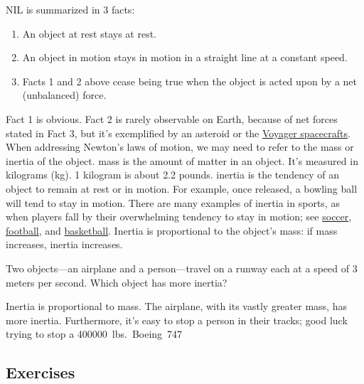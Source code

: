 \documentclass[main.tex]{subfiles}
\begin{document}
\begin{mdframed}[backgroundcolor=black!10]
\gls{NIL} is summarized in 3 facts:
\vspace{-1ex}

\begin{enumerate}
\setlength\itemsep{0ex}
    \item An object at rest stays at rest.
    \item An object in motion stays in motion in a straight line at a constant speed.
    \item Facts 1 and 2 above cease being true when the object is acted upon by a net (unbalanced) force.
\end{enumerate}
\end{mdframed}

Fact 1 is obvious. Fact 2 is rarely observable on Earth, because of net forces stated in Fact 3, but it's exemplified by an asteroid or the \href{https://voyager.jpl.nasa.gov/mission/status/}{Voyager spacecrafts}. When addressing Newton's laws of motion, we may need to refer to the mass or inertia of the object. \Gls{mass} is the amount of matter in an object. It's measured in kilograms (kg). 1 kilogram is about 2.2 pounds. \Gls{inertia} is the tendency of an object to remain at rest or in motion. For example, once released, a bowling ball will tend to stay in motion. There are many examples of inertia in sports, as when players fall by their overwhelming tendency to stay in motion; see \href{https://youtu.be/5PKXs8i_zSw?t=21}{soccer}, \href{https://youtu.be/4TgpW0WZZ6U?t=55}{football}, and \href{https://youtu.be/IGBpvIXGMYQ?t=26}{basketball}. Inertia is proportional to the object's mass: if mass increases, inertia increases.

\begin{example}
Two objects---an airplane and a person---travel on a runway each at a speed of 3 meters per second. Which object has more inertia?
\end{example}

\Solution Inertia is proportional to mass. The airplane, with its vastly greater mass, has more inertia. Furthermore, it's easy to stop a person in their tracks; good luck trying to stop a \SI{400000}{lbs.} Boeing 747.

\solutionEnd

\vspace{1em}

\cyanhrule


\subsection{Exercises}
\end{document}
